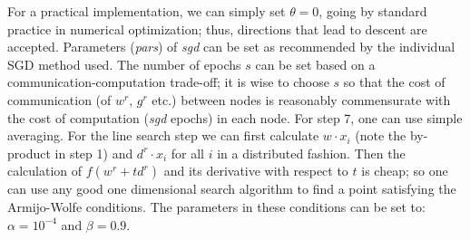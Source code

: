 \documentclass{article} %
\begin{document}
For a practical implementation, we can simply set $\theta=0$, going by standard practice in numerical optimization; thus, directions that lead to descent are accepted. Parameters ({\it pars}) of {\it sgd} can be set as recommended by the individual SGD method used. The number of epochs $s$ can be set based on a communication-computation trade-off; it is wise to choose $s$ so that the cost of communication (of $w^r$, $g^r$ etc.) between nodes is reasonably commensurate with the cost of computation ({\it sgd} epochs) in each node. For step 7, one can use simple averaging. For the line search step we can first calculate $w\cdot x_i$ (note the by-product in step 1) and $d^r\cdot x_i$ for all $i$ in a distributed fashion. Then the calculation of $f(w^r+td^r)$ and its derivative with respect to $t$ is cheap; so one can use any good one dimensional search algorithm to find a point satisfying the Armijo-Wolfe conditions. The parameters in these conditions can be set to: $\alpha=10^{-4}$ and $\beta=0.9$.
\end{document}
